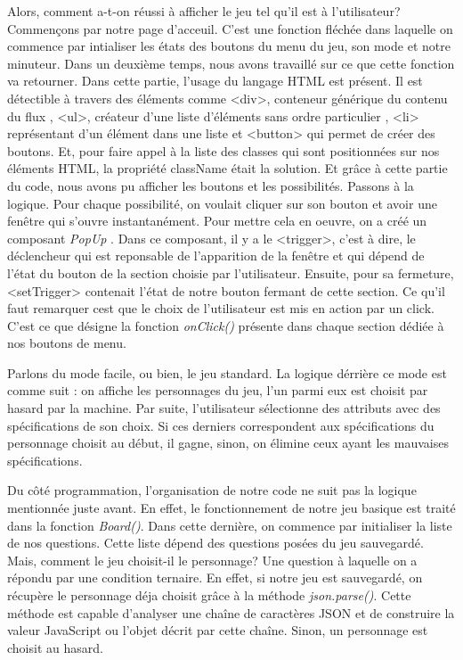 \documentclass[a4paper, 12pt]{article}
\begin{document}
Alors, comment a-t-on réussi à afficher le jeu tel qu'il est à l'utilisateur? \newline
Commençons par notre page d'acceuil. C'est une fonction fléchée dans laquelle on commence par intialiser les états des boutons du menu du jeu, son mode et notre minuteur.\newline
Dans un deuxième temps, nous avons travaillé sur ce que cette fonction va retourner. Dans cette partie, l'usage du langage HTML est présent. Il est détectible à travers des éléments comme <div>, conteneur générique du contenu du flux , <ul>, créateur d'une liste d'éléments sans ordre particulier , <li> représentant  d'un élément dans une liste et <button> qui permet de créer des boutons.
Et, pour faire appel à la liste  des classes qui sont positionnées sur nos éléments HTML, la propriété className était la solution. 
Et grâce à cette partie du code, nous avons pu afficher les boutons et les possibilités. \newline
Passons à la logique. Pour chaque possibilité, on voulait cliquer sur son bouton et avoir une fenêtre qui s'ouvre instantanément. Pour mettre cela en oeuvre, on a créé un composant\textit{ PopUp }. Dans ce composant, il y a le <trigger>, c'est à dire, le déclencheur qui est reponsable de l'apparition de la fenêtre et qui dépend de l'état du bouton de la section choisie par l'utilisateur. Ensuite, pour sa fermeture, <setTrigger> contenait l'état de notre bouton fermant de cette section. Ce qu'il faut remarquer cest que le choix de l'utilisateur est mis en action par un click. C'est ce que désigne la fonction \textit{onClick()} présente dans chaque section dédiée à nos boutons de menu.  \newline
\newpage

Parlons du mode facile, ou bien, le jeu standard. La logique dérrière ce mode est comme suit : on affiche les personnages du jeu, l'un parmi eux est choisit par hasard par la machine. Par suite, l'utilisateur sélectionne des attributs avec des spécifications de son choix. Si ces derniers correspondent aux spécifications du personnage choisit au début, il gagne, sinon, on élimine ceux ayant les mauvaises spécifications.\newline

Du côté programmation, l'organisation de notre code ne suit pas la logique mentionnée juste avant. En effet, le fonctionnement de notre jeu basique est traité dans la fonction \textit{Board()}. Dans cette dernière, on commence par initialiser la liste de nos questions. Cette liste dépend des questions posées du jeu sauvegardé. \newline
Mais, comment le jeu choisit-il le personnage? \newline
Une question à laquelle on a répondu par une condition ternaire. En effet, si notre jeu est sauvegardé, on récupère le personnage déja choisit grâce à la méthode  \textit{json.parse()}. Cette méthode est capable d'analyser une chaîne de caractères JSON et  de construire la valeur JavaScript ou l'objet décrit par cette chaîne. Sinon, un personnage est choisit au hasard.\newline
\end{document}
